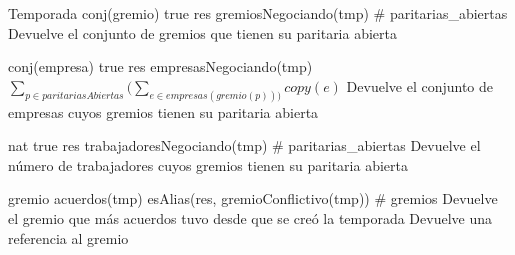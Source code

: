 \begin{interfaz}{Temporada}
{}{conj(gremio)}
{true}
{res \igobs gremiosNegociando(tmp)}
{\# paritarias\_abiertas}
{Devuelve el conjunto de gremios que tienen su paritaria abierta }
{}

{}{conj(empresa)}
{true}
{res \igobs empresasNegociando(tmp)}
{\ensuremath{\sum_{p \in paritariasAbiertas} (\sum_{e \in empresas(gremio(p)))} copy(e)}}
{Devuelve el conjunto de empresas cuyos gremios tienen su paritaria abierta}
{}

{}{nat}
{true}
{res \igobs trabajadoresNegociando(tmp)}
{\# paritarias\_abiertas}
{Devuelve el número de trabajadores cuyos gremios tienen su paritaria abierta}
{}

{}{gremio}
{\emptyset \neq acuerdos(tmp)}
{ esAlias(res, gremioConflictivo(tmp))}
{\# gremios}
{Devuelve el gremio que más acuerdos tuvo desde que se creó la temporada }
{Devuelve una referencia al gremio}


\end{interfaz}